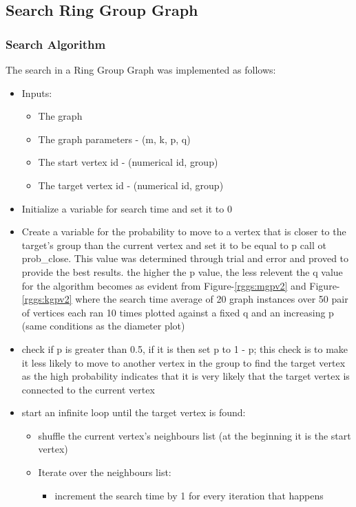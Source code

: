 \documentclass[11pt,a4paper,notitlepage]{article}
\begin{document}
\subsection*{Search Ring Group Graph}
\subsubsection*{Search Algorithm}
The search in a Ring Group Graph was implemented as follows:
\begin{itemize}
    \item Inputs:
    \begin{itemize}
        \item The graph
        \item The graph parameters - (m, k, p, q)
        \item The start vertex id - (numerical id, group)
        \item The target vertex id - (numerical id, group)
    \end{itemize}
    \item Initialize a variable for search time and set it to 0
    \item Create a variable for the probability to move to a vertex that is closer to the target's group than the current vertex and set it to be equal to p call ot prob\_close. This value was determined through trial and error and proved to provide the best results. the higher the p value, the less relevent the q value for the algorithm becomes as evident from Figure-\ref{rggs:mgpv2} and Figure-\ref{rggs:kgpv2} where the search time average of 20 graph instances over 50 pair of vertices each ran 10 times plotted against a fixed q and an increasing p (same conditions as the diameter plot)
    \item check if p is greater than 0.5, if it is then set p to 1 - p; this check is to make it less likely to move to another vertex in the group to find the target vertex as the high probability indicates that it is very likely that the target vertex is connected to the current vertex
    \item start an infinite loop until the target vertex is found:
    \begin{itemize}
        \item shuffle the current vertex's neighbours list (at the beginning it is the start vertex)
        \item Iterate over the neighbours list:
        \begin{itemize}
            \item increment the search time by 1 for every iteration that happens

\end{itemize}
\end{itemize}
\end{itemize}
\end{document}
